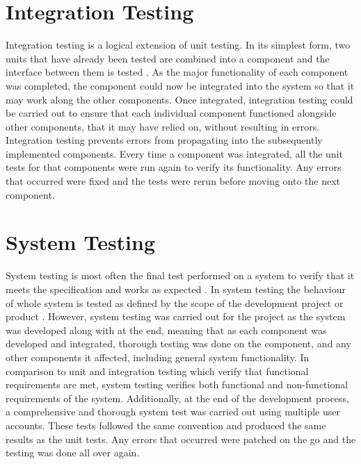 \begin{longtabu}
\caption{Unit testing}
\label{tab:unit-testing}
\end{longtabu}

\section{Integration Testing}
Integration testing is a logical extension of unit testing. In its simplest form, two units that have already been tested are combined into a component and the interface between them is tested \cite{MSDN:IntegrationTesting}. As the major functionality of each component was completed, the component could now be integrated into the system so that it may work along the other components. Once integrated, integration testing could be carried out to ensure that each individual component functioned alongside other components, that it may have relied on, without resulting in errors. Integration testing prevents errors from propagating into the subsequently implemented components. Every time a component was integrated, all the unit tests for that components were run again to verify its functionality. Any errors that occurred were fixed and the tests were rerun before moving onto the next component.

\section{System Testing}
System testing is most often the final test performed on a system to verify that it meets the specification and works as expected \cite{ISTQB:SystemTesting}. In system testing the behaviour of whole system is tested as defined by the scope of the development project or product \cite{ISTQB:SystemTesting}. However, system testing was carried out for the project as the system was developed along with at the end, meaning that as each component was developed and integrated, thorough testing was done on the component, and any other components it affected, including general system functionality. In comparison to unit and integration testing which verify that functional requirements are met, system testing verifies both functional and non-functional requirements of the system. Additionally, at the end of the development process, a comprehensive and thorough system test was carried out using multiple user accounts. These tests followed the same convention and produced the same results as the unit tests. Any errors that occurred were patched on the go and the testing was done all over again.

